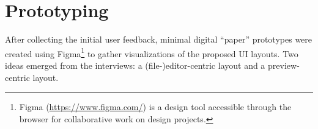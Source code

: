 
%
\chapter{Prototyping}
\label{chap:prototyping} 

After collecting the initial user feedback, minimal digital ``paper'' prototypes were created using Figma\footnote{Figma (\url{https://www.figma.com/}) is a design tool accessible through the browser for collaborative work on design projects.} to gather visualizations of the proposed UI layouts.
Two ideas emerged from the interviews: a (file-)editor-centric layout and a preview-centric layout.
